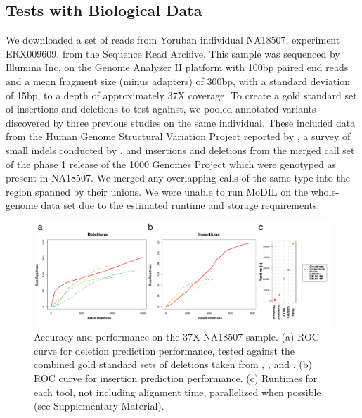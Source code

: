 \documentclass[11pt]{article}
\begin{document}
\subsection{Tests with Biological Data}

We downloaded a set of reads from Yoruban individual NA18507, experiment ERX009609, from the Sequence Read Archive. This sample was sequenced by Illumina Inc. on the Genome Analyzer II platform with 100bp paired end reads and a mean fragment size (minus adapters) of 300bp, with a standard deviation of 15bp, to a depth of approximately 37X coverage. To create a gold standard set of insertions and deletions to test against, we pooled annotated variants discovered by three previous studies on the same individual. These included data from the Human Genome Structural Variation Project reported by \textcite{Kidd:2008p926}, a survey of small indels conducted by \textcite{Mills:2011fi}, and insertions and deletions from the merged call set of the phase 1 release of the 1000 Genomes Project \autocite{GenomesProjectConsortium:2012co} which were genotyped as present in NA18507. We merged any overlapping calls of the same type into the region spanned by their unions. We were unable to run MoDIL on the whole-genome data set due to the estimated runtime and storage requirements.

\begin{figure}
\centering
\includegraphics[width=1\textwidth]{../figures/NA18507_rocs_runtimes_journal.pdf}
\caption{Accuracy and performance on the 37X NA18507 sample. (a) ROC curve for deletion prediction performance, tested against the combined gold standard sets of deletions taken from \textcite{Kidd:2008p926}, \textcite{Mills:2011fi}, and \textcite{GenomesProjectConsortium:2012co}. (b) ROC curve for insertion prediction performance. (c) Runtimes for each tool, not including alignment time, parallelized when possible (see Supplementary Material). }
\label{NA18507CombinedRoc}
\end{figure}
\end{document}
